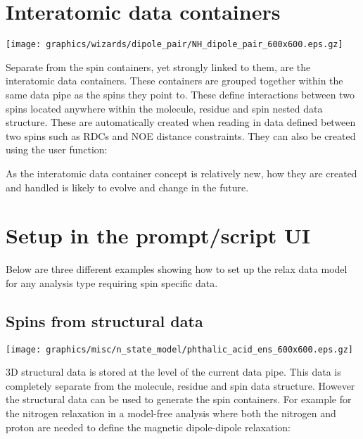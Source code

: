 \section{Interatomic data containers} \label{sect: interatomic container}

\begin{figure*}[h]
\texttt{[image: graphics/wizards/dipole\_pair/NH\_dipole\_pair\_600x600.eps.gz]}
\end{figure*}

Separate from the spin containers, yet strongly linked to them, are the interatomic data containers.  These containers are grouped together within the same data pipe as the spins they point to.  These define interactions between two spins located anywhere within the molecule, residue and spin nested data structure.  These are automatically created when reading in data defined between two spins such as RDCs and NOE distance constraints.  They can also be created using the  user function:


As the interatomic data container concept is relatively new, how they are created and handled is likely to evolve and change in the future.




\section{Setup in the prompt/script UI}

Below are three different examples showing how to set up the relax data model for any analysis type requiring spin specific data.



\subsection{Spins from structural data} \label{sect: script - structural data}

\begin{figure*}[h]
\texttt{[image: graphics/misc/n\_state\_model/phthalic\_acid\_ens\_600x600.eps.gz]}
\end{figure*}

3D structural data is stored at the level of the current data pipe.  This data is completely separate from the molecule, residue and spin data structure.  However the structural data can be used to generate the spin containers.  For example for the nitrogen relaxation in a model-free analysis where both the nitrogen and proton are needed to define the magnetic dipole-dipole relaxation:

